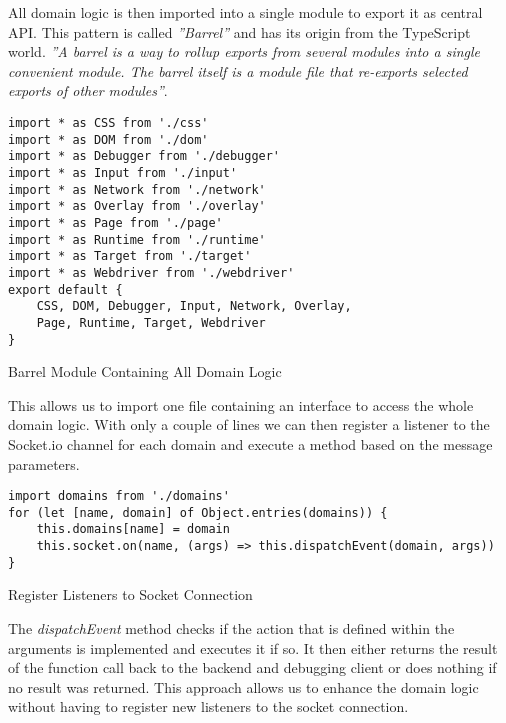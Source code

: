 All domain logic is then imported into a single module to export it as central API. This pattern is called \textit{''Barrel''} and has its origin from the TypeScript world. \textit{''A barrel is a way to rollup exports from several modules into a single convenient module. The barrel itself is a module file that re-exports selected exports of other modules''}\cite{barrel}.

\begin{listing}[H]
\begin{verbatim}
import * as CSS from './css'
import * as DOM from './dom'
import * as Debugger from './debugger'
import * as Input from './input'
import * as Network from './network'
import * as Overlay from './overlay'
import * as Page from './page'
import * as Runtime from './runtime'
import * as Target from './target'
import * as Webdriver from './webdriver'
export default {
    CSS, DOM, Debugger, Input, Network, Overlay,
    Page, Runtime, Target, Webdriver
}
\end{verbatim}
\caption{Barrel Module Containing All Domain Logic}
\label{lst:barrel}
\end{listing}

This allows us to import one file containing an interface to access the whole domain logic. With only a couple of lines we can then register a listener to the Socket.io channel for each domain and execute a method based on the message parameters.

\begin{listing}[H]
\begin{verbatim}
import domains from './domains'
for (let [name, domain] of Object.entries(domains)) {
    this.domains[name] = domain
    this.socket.on(name, (args) => this.dispatchEvent(domain, args))
}
\end{verbatim}
\caption{Register Listeners to Socket Connection}
\label{lst:barrel}
\end{listing}

The \textit{dispatchEvent} method checks if the action that is defined within the arguments is implemented and executes it if so. It then either returns the result of the function call back to the backend and debugging client or does nothing if no result was returned. This approach allows us to enhance the domain logic without having to register new listeners to the socket connection.

